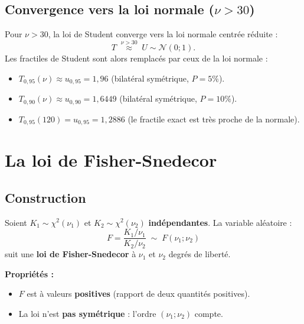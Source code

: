 \documentclass[11pt,a4paper]{article}
\newcommand{\N}{\mathcal{N}}
\begin{document}
\subsection{Convergence vers la loi normale ($\nu > 30$)}

\begin{thmbox}[Convergence]
Pour $\nu > 30$, la loi de Student converge vers la loi normale centr\'ee r\'eduite :
$$T \;\overset{\nu > 30}{\approx}\; U \sim \N(0;1).$$
Les fractiles de Student sont alors remplac\'es par ceux de la loi normale :
\begin{itemize}
\item $T_{0{,}95}(\nu) \approx u_{0{,}95} = 1{,}96$ (bilat\'eral sym\'etrique, $P=5\%$).
\item $T_{0{,}90}(\nu) \approx u_{0{,}90} = 1{,}6449$ (bilat\'eral sym\'etrique, $P=10\%$).
\item $T_{0{,}95}(120) = u_{0{,}95} = 1{,}2886$ (le fractile exact est tr\`es proche de la normale).
\end{itemize}
\end{thmbox}

\newpage
\section{La loi de Fisher-Snedecor}

\subsection{Construction}

\begin{defbox}
Soient $K_1 \sim \chi^2(\nu_1)$ et $K_2 \sim \chi^2(\nu_2)$ \textbf{ind\'ependantes}. La variable al\'eatoire :
$$F = \frac{K_1/\nu_1}{K_2/\nu_2} \;\sim\; F(\nu_1;\nu_2)$$
suit une \textbf{loi de Fisher-Snedecor} \`a $\nu_1$ et $\nu_2$ degr\'es de libert\'e.
\end{defbox}

\textbf{Propri\'et\'es :}
\begin{itemize}
\item $F$ est \`a valeurs \textbf{positives} (rapport de deux quantit\'es positives).
\item La loi n'est \textbf{pas sym\'etrique} : l'ordre $(\nu_1;\nu_2)$ compte.
\end{itemize}
\end{document}
